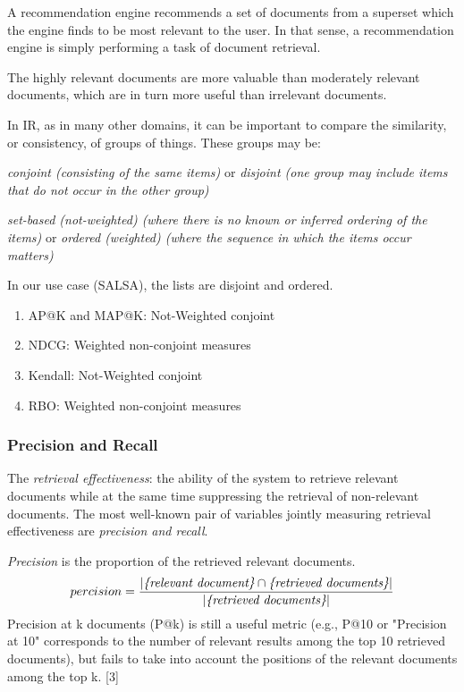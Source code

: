 A recommendation engine recommends a set of documents from a superset which the engine finds to be most relevant to the user. In that sense, a recommendation engine is simply performing a task of document retrieval.

The highly relevant documents are more valuable than moderately relevant documents, which are in turn more useful than irrelevant documents.

In IR, as in many other domains, it can be important to compare the similarity, or consistency, of groups of things. These groups may be:

\begin{description}
	\item \emph{conjoint (consisting of the same items)} or \emph{disjoint (one group may include items that do not occur in the other group)}
	\item \emph{set-based (not-weighted) (where there is no known or inferred ordering of the items)} or \emph{ordered (weighted) (where the sequence in which the items occur matters)}
\end{description}

In our use case (SALSA), the lists are disjoint and ordered.
\begin{enumerate}
	\item AP@K and MAP@K: Not-Weighted conjoint
	\item NDCG: Weighted non-conjoint measures
	\item Kendall: Not-Weighted conjoint
	\item RBO: Weighted non-conjoint measures
\end{enumerate}

\subsubsection{Precision and Recall}
\label{Precision and Recall}
The \emph{retrieval effectiveness}: the ability of the system to retrieve relevant documents while at the same time suppressing the retrieval of non-relevant documents. 
The most well-known pair of variables jointly measuring retrieval effectiveness are \emph{precision and recall}.

\emph{Precision} is the proportion of the retrieved relevant documents.
\begin{equation}
	percision = \frac{|\emph{\{relevant document\}} \cap \emph{\{retrieved documents\}}|}{|\emph{\{retrieved documents\}}|}
	\label{eq:percision}
\end{equation}
Precision at k documents (P@k) is still a useful metric (e.g., P@10 or "Precision at 10" corresponds to the number of relevant results among the top 10 retrieved documents), 
but fails to take into account the positions of the relevant documents among the top k. [3]

